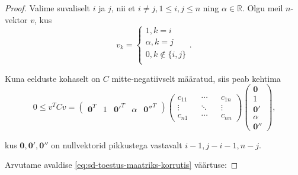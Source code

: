 \documentclass[a4paper,12pt,oneside]{article}
\numberwithin{equation}{section}
\theoremstyle{definition}
\begin{document}
\begin{proof}

Valime suvaliselt $i$ ja $j$, nii et $i \neq j, 1 \leq i,j \leq n$ ning $\alpha \in \mathbb{R}$. Olgu meil $n$-vektor $v$, kus
\begin{equation*}
v_k =
\begin{cases}
1, k=i \\
\alpha, k=j \\
0, k \not \in \lbrace i, j \rbrace \\
\end{cases} \text{.}
\end{equation*}

Kuna eelduste kohaselt on $C$ mitte-negatiivselt määratud, siis peab kehtima 
\begin{equation}
\label{eq:sd-toestus-maatriks-korrutis}
0 \leq v^{T}Cv = 
\begin{pmatrix}
\mathbf{0}^T & 1 & \mathbf{0'}^T & \alpha & \mathbf{0''}^T
\end{pmatrix}
\begin{pmatrix}
c_{11} && \cdots && c_{1n} \\
\vdots && \ddots && \vdots \\
c_{n1} && \cdots && c_{nn}  
\end{pmatrix}
\begin{pmatrix}
\mathbf{0} \\ 
1 \\
\mathbf{0'} \\
\alpha \\
\mathbf{0''} 
\end{pmatrix} \text{,}
\end{equation}

kus $\mathbf{0},\mathbf{0'},\mathbf{0''}$ on nullvektorid pikkustega vastavalt $i-1,j-i-1, n-j$.



Arvutame avaldise \ref{eq:sd-toestus-maatriks-korrutis} väärtuse:


\end{proof}
\end{document}
